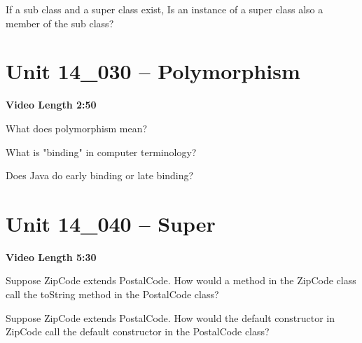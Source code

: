 \documentclass[letterpaper,12pt]{exam}
\newcommand{\unit}{Unit 14}
\begin{document}
\begin{questions}
\begin{samepage}
    \question If a sub class and a super class exist, Is an instance of a super class also a member of the sub class?
    \vspace{5mm}
\end{samepage}


\section*{\unit\_030 -- Polymorphism} 
\par{\selectfont\textbf{Video Length 2:50}}

\begin{samepage}
    \question What does polymorphism mean?
    \vspace{5mm}
\end{samepage}

\begin{samepage}
    \question What is "binding" in computer terminology?
    \vspace{5mm}
\end{samepage}

\begin{samepage}
    \question Does Java do early binding or late binding?
    \vspace{5mm}
\end{samepage}


\section*{\unit\_040 -- Super} 
\par{\selectfont\textbf{Video Length 5:30}}

\begin{samepage}
    \question Suppose ZipCode extends PostalCode.  How would a method in the ZipCode class call the toString method in the PostalCode class?
    \vspace{5mm}
\end{samepage}

\begin{samepage}
    \question Suppose ZipCode extends PostalCode.  How would the default constructor in ZipCode call the default constructor in the PostalCode class?
    \vspace{5mm}
\end{samepage}


\end{questions}
\end{document}
